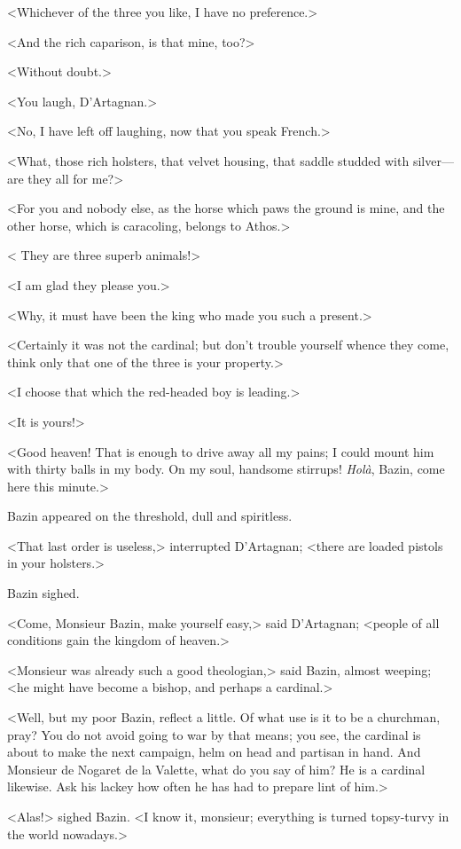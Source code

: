 <Whichever of the three you like, I have no preference.> 

<And the rich caparison, is that mine, too?> 

<Without doubt.> 

<You laugh, D'Artagnan.> 

<No, I have left off laughing, now that you speak French.> 

<What, those rich holsters, that velvet housing, that saddle studded with silver—are they all for me?> 

<For you and nobody else, as the horse which paws the ground is mine, and the other horse, which is caracoling, belongs to Athos.> 

< They are three superb animals!> 

<I am glad they please you.> 

<Why, it must have been the king who made you such a present.> 

<Certainly it was not the cardinal; but don't trouble yourself whence they come, think only that one of the three is your property.> 

<I choose that which the red-headed boy is leading.> 

<It is yours!> 

<Good heaven! That is enough to drive away all my pains; I could mount him with thirty balls in my body. On my soul, handsome stirrups! \emph{Holà}, Bazin, come here this minute.> 

Bazin appeared on the threshold, dull and spiritless. 

<That last order is useless,> interrupted D'Artagnan; <there are loaded pistols in your holsters.> 

Bazin sighed. 

<Come, Monsieur Bazin, make yourself easy,> said D'Artagnan; <people of all conditions gain the kingdom of heaven.> 

<Monsieur was already such a good theologian,> said Bazin, almost weeping; <he might have become a bishop, and perhaps a cardinal.> 

<Well, but my poor Bazin, reflect a little. Of what use is it to be a churchman, pray? You do not avoid going to war by that means; you see, the cardinal is about to make the next campaign, helm on head and partisan in hand. And Monsieur de Nogaret de la Valette, what do you say of him? He is a cardinal likewise. Ask his lackey how often he has had to prepare lint of him.> 

<Alas!> sighed Bazin. <I know it, monsieur; everything is turned topsy-turvy in the world nowadays.> 

